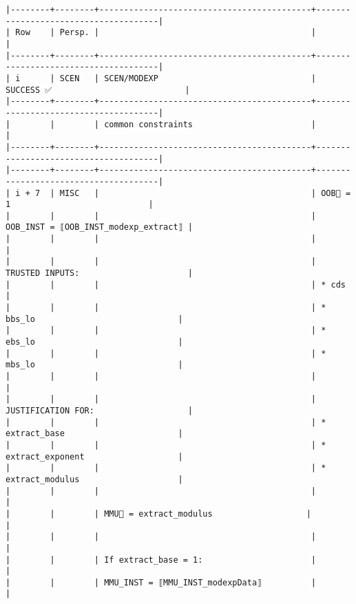 \documentclass[varwidth=\maxdimen,margin=0.5cm,multi={verbatim}]{standalone}
\begin{document}
\begin{verbatim}
|--------+--------+-------------------------------------------+--------------------------------------|
| Row    | Persp. |                                           |                                      |
|--------+--------+-------------------------------------------+--------------------------------------|
| i      | SCEN   | SCEN/MODEXP                               | SUCCESS ✅                           |
|--------+--------+-------------------------------------------+--------------------------------------|
|        |        | common constraints                        |                                      |
|--------+--------+-------------------------------------------+--------------------------------------|
|--------+--------+-------------------------------------------+--------------------------------------|
| i + 7  | MISC   |                                           | OOB🏴 = 1                            |
|        |        |                                           | OOB_INST = ⟦OOB_INST_modexp_extract⟧ |
|        |        |                                           |                                      |
|        |        |                                           | TRUSTED INPUTS:                      |
|        |        |                                           | * cds                                |
|        |        |                                           | * bbs_lo                             |
|        |        |                                           | * ebs_lo                             |
|        |        |                                           | * mbs_lo                             |
|        |        |                                           |                                      |
|        |        |                                           | JUSTIFICATION FOR:                   |
|        |        |                                           | * extract_base                       |
|        |        |                                           | * extract_exponent                   |
|        |        |                                           | * extract_modulus                    |
|        |        |                                           |                                      |
|        |        | MMU🏴 = extract_modulus                   |                                      |
|        |        |                                           |                                      |
|        |        | If extract_base = 1:                      |                                      |
|        |        | MMU_INST = ⟦MMU_INST_modexpData⟧          |                                      |

\end{verbatim}
\end{document}
